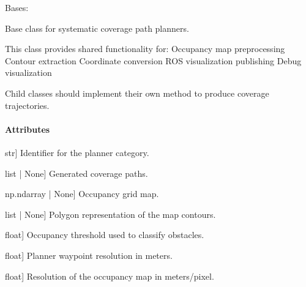 \documentclass[letterpaper,10pt,english]{sphinxmanual}
\begin{document}
\begin{fulllineitems}
\label{\detokenize{mirte_lc_nav2.navigator_types:mirte_lc_nav2.navigator_types.SystematicNavigator}}
\pysigstartsignatures
\pysiglinewithargsret
{}
{\sphinxparamcomma {}\sphinxparamcomma {}}
{}
\pysigstopsignatures
\sphinxAtStartPar
Bases: 

\sphinxAtStartPar
Base class for systematic coverage path planners.

\sphinxAtStartPar
This class provides shared functionality for:
\sphinxhyphen{} Occupancy map preprocessing
\sphinxhyphen{} Contour extraction
\sphinxhyphen{} Coordinate conversion
\sphinxhyphen{} ROS visualization publishing
\sphinxhyphen{} Debug visualization

\sphinxAtStartPar
Child classes should implement their own 
method to produce coverage trajectories.


\paragraph{Attributes}
\label{\detokenize{mirte_lc_nav2.navigator_types:attributes}}\begin{description}
\sphinxlineitem{navigator\_type}{[}str{]}
\sphinxAtStartPar
Identifier for the planner category.

\sphinxlineitem{paths}{[}list | None{]}
\sphinxAtStartPar
Generated coverage paths.

\sphinxlineitem{map}{[}np.ndarray | None{]}
\sphinxAtStartPar
Occupancy grid map.

\sphinxlineitem{polymap}{[}list | None{]}
\sphinxAtStartPar
Polygon representation of the map contours.

\sphinxlineitem{threshold}{[}float{]}
\sphinxAtStartPar
Occupancy threshold used to classify obstacles.

\sphinxlineitem{resolution}{[}float{]}
\sphinxAtStartPar
Planner waypoint resolution in meters.

\sphinxlineitem{map\_resolution}{[}float{]}
\sphinxAtStartPar
Resolution of the occupancy map in meters/pixel.


\end{description}
\end{fulllineitems}
\end{document}
